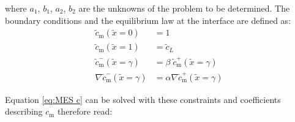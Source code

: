 where $a_1$, $b_1$, $a_2$, $b_2$ are the unknowns of the problem to be determined.
The boundary conditions and the equilibrium law at the interface are defined as:
\begin{subequations} \label{eq: bcs MES}
\begin{align} 
        \tilde{c}_\mathrm{m}(\tilde{x}=0) & = 1 \\
        \tilde{c}_\mathrm{m}(\tilde{x}=1) & =  \tilde{c}_L \\
        \tilde{c}_\mathrm{m}^-(\tilde{x}=\gamma) & =  \beta \; \tilde{c}_\mathrm{m}^+(\tilde{x}=\gamma)\\
        \nabla \tilde{c}_\mathrm{m}^-(\tilde{x}=\gamma) & =  \alpha \nabla \tilde{c}_\mathrm{m}^+(\tilde{x}=\gamma)
\end{align}
\end{subequations}


Equation \ref{eq:MES c} can be solved with these constraints and coefficients describing $c_\mathrm{m}$ therefore read:



